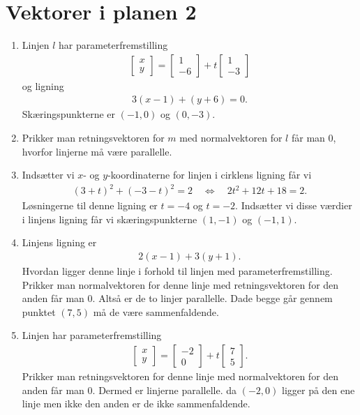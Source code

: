 \section{Vektorer i planen 2}
\begin{enumerate}
	\item Linjen $l$ har parameterfremstilling
	\begin{align*}
	\begin{bmatrix}
	x\\y
	\end{bmatrix}=\begin{bmatrix}
	1\\-6
	\end{bmatrix}+t \begin{bmatrix}
	1\\-3
	\end{bmatrix}
	\end{align*}
	og ligning
	\begin{align*}
	3(x-1)+(y+6)=0.
	\end{align*}
	Skæringspunkterne er $(-1,0)$ og $(0,-3)$.
	
	\item Prikker man retningsvektoren for $m$ med normalvektoren for $l$ får man $0$, hvorfor linjerne må være parallelle.
	
	\item Indsætter vi $x$- og $y$-koordinaterne for linjen i cirklens ligning får vi
	\begin{align*}
	(3+t)^2+(-3-t)^2=2\quad \Leftrightarrow\quad 2t^2+12t+18=2.
	\end{align*} 
	Løsningerne til denne ligning er $t=-4$ og $t=-2$. Indsætter vi disse værdier i linjens ligning får vi skæringspunkterne $(1,-1)$ og $(-1,1)$.
	
		
	\item Linjens ligning er
	\begin{align*}
	2(x-1)+3(y+1).
	\end{align*}
	Hvordan ligger denne linje i forhold til linjen med parameterfremstilling. Prikker man normalvektoren for denne linje med retningsvektoren for den anden får man $0$. Altså er de to linjer parallelle. Dade begge går gennem punktet $(7,5)$ må de være sammenfaldende.
	
	
	
	
	\item Linjen har parameterfremstilling
	\begin{align*}
		\begin{bmatrix}
		x\\y
		\end{bmatrix}=\begin{bmatrix}
		-2\\0
		\end{bmatrix}+t \begin{bmatrix}
		7\\5
		\end{bmatrix}.
	\end{align*}
 	Prikker man retningsvektoren for denne linje med normalvektoren for den anden får man $0$. Dermed er linjerne parallelle. da $(-2,0)$ ligger på den ene linje men ikke den anden er de ikke sammenfaldende.
		

\end{enumerate}
